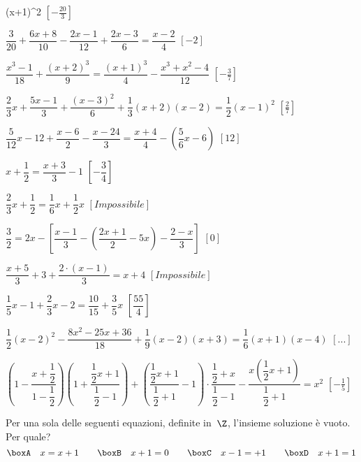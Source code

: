 \begin{esercizio}[\Ast]
\begin{enumeratea}
        \left(x+1\right)^{2}\)
  \hfill \(\left[-{\frac{20}{3}}\right]\)
 \item \(\dfrac{3}{20}+\dfrac{6x+8}{10}-\dfrac{2x-1}{12}+\dfrac{2x-3}{6}=
        \dfrac{x-2}{4}\)
  \hfill \(\left[-2\right]\)
 \item \(\dfrac{x^{3}-1}{18}+\dfrac{(x+2)^{3}}{9}=
        \dfrac{(x+1)^{3}}{4}-\dfrac{x^{3}+x^{2}-4}{12}\)
  \hfill \(\left[-{\frac{3}{7}}\right]\)
 \item \(\dfrac{2}{3}x+\dfrac{5x-1}{3}+\dfrac{(x-3)^{2}}{6}+
        \dfrac{1}{3}(x+2)(x-2)=\dfrac{1}{2}(x-1)^{2}\)
  \hfill \(\left[\frac{2}{7}\right]\)
 \item \(\dfrac{5}{12}x-12+\dfrac{x-6}{2}-\dfrac{x-24}{3}=
        \dfrac{x+4}{4}-\left(\dfrac{5}{6}x-6\right)\)
  \hfill \(\left[12\right]\)
 \item \(x+\dfrac{1}{2}=\dfrac{x+3}{3}-1\)
  \hfill \(\left[-\dfrac{3}{4}\right]\)
 \item \(\dfrac{2}{3}x+\dfrac{1}{2}=\dfrac{1}{6}x+\dfrac{1}{2}x\)
  \hfill \(\left[Impossibile\right]\)
 \item \(\dfrac{3}{2}=2x-\left[\dfrac{x-1}{3}-
        \left(\dfrac{2x+1}{2}-5x\right)-\dfrac{2-x}{3}\right]\)
  \hfill \(\left[0\right]\)
 \item \(\dfrac{x+5}{3}+3+\dfrac{2\cdot \left(x-1\right)}{3}=x+4\)
  \hfill \(\left[Impossibile\right]\)
 \item \(\dfrac{1}{5}x-1+\dfrac{2}{3}x-2=\dfrac{10}{15}+\dfrac{3}{5}x\)
  \hfill \(\left[\dfrac{55}{4}\right]\)
 \item 
\(\dfrac{1}{2}(x-2)^{2}-\dfrac{8x^{2}-25x+36}{18}+\dfrac{1}{9}(x-2)(x+3)=
        \dfrac{1}{6}(x+1)(x-4)\)
  \hfill \(\left[...\right]\)
 \item \(\left(1-\dfrac{x+\dfrac{1}{2}}{1-\dfrac{1}{2}}\right)
        \left(1+\dfrac{\dfrac{1}{2}x+1}{\dfrac{1}{2}-1}\right)+
        \left(\dfrac{\dfrac{1}{2}x+1}{\dfrac{1}{2}+1}-1\right)\cdot 
        {\dfrac{\dfrac{1}{2}+x}{\dfrac{1}{2}-1}}-
        \dfrac{x\left(\dfrac{1}{2}x+1\right)}{\dfrac{1}{2}+1}=x^{2}\)
  \hfill \(\left[-{\frac{1}{5}}\right]\)
\end{enumeratea}
\end{esercizio}

\begin{esercizio}
\label{ese:13.44}
Per una sola delle seguenti equazioni, definite in~\(\Z\), l'insieme 
soluzione 
è vuoto. Per quale?
\[\boxA\quad x=x+1\qquad\boxB\quad x+1=0\qquad\boxC\quad x-1=+1\qquad\boxD\quad 
x+1=1\]
\end{esercizio}

